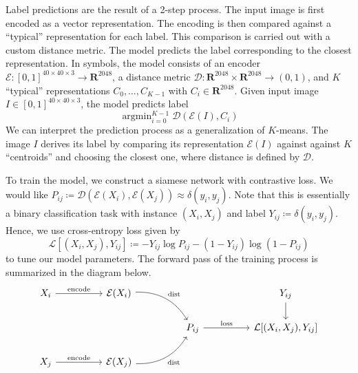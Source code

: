 \documentclass[12pt]{article}
\newcommand{\argmin}{\ensuremath{\mathop{\arg\min}\limits}}
\begin{document}
Label predictions are the result of a 2-step process. The input image is first encoded as a vector representation. The encoding is then compared against a ``typical'' representation for each label. This comparison is carried out with a custom distance metric. The model predicts the label corresponding to the closest representation. In symbols, the model consists of an encoder \(\mathcal{E} \colon [0, 1]^{40 \times 40 \times 3} \to \mathbf{R}^{2048}\), a distance metric \(\mathcal{D} \colon \mathbf{R}^{2048} \times \mathbf{R}^{2048} \to (0, 1)\), and \(K\) ``typical'' representations \(C_0, \dotsc, C_{K - 1}\) with \(C_i \in \mathbf{R}^{2048}\). Given input image \(I \in [0, 1]^{40 \times 40 \times 3}\), the model predicts label
\begin{equation}
    \argmin_{i = 0}^{K - 1} \mathcal{D}(\mathcal{E}(I), C_i) \label{eq:prediction}
\end{equation}
We can interpret the prediction process as a generalization of \(K\)-means. The image \(I\) derives its label by comparing its representation \(\mathcal{E}(I)\) against against \(K\) ``centroids'' and choosing the closest one, where distance is defined by \(\mathcal{D}\).

To train the model, we construct a siamese network with contrastive loss. We would like \(P_{ij} \coloneqq \mathcal{D}(\mathcal{E}(X_i), \mathcal{E}(X_j)) \approx \delta(y_i, y_j)\). Note that this is essentially a binary classification task with instance \((X_i, X_j)\) and label \(Y_{ij} \coloneqq \delta(y_i, y_j)\). Hence, we use cross-entropy loss given by
\begin{equation}
    \mathcal{L}[(X_i, X_j), Y_{ij}] \coloneqq -Y_{ij} \log P_{ij} - (1 - Y_{ij}) \log (1 - P_{ij}) \label{eq:cross_entropy}
\end{equation}
to tune our model parameters. The forward pass of the training process is summarized in the diagram below.
\begin{equation*}
    \begin{tikzcd}
        X_i \arrow[rr, "\text{encode}"] &  & \mathcal{E}(X_i) \arrow[rrd, "\text{dist}", bend left]   &  &                                  &  & Y_{ij} \arrow[d]                  \\
        &  &                                                          &  & P_{ij} \arrow[rr, "\text{loss}"] &  & {\mathcal{L}[(X_i, X_j), Y_{ij}]} \\
        X_j \arrow[rr, "\text{encode}"] &  & \mathcal{E}(X_j) \arrow[rru, "\text{dist}"', bend right] &  &                                  &  &
    \end{tikzcd} \label{eq:training}
\end{equation*}
\end{document}
